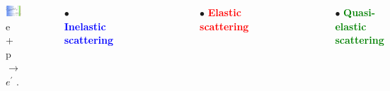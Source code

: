 \documentclass[12pt]{beamer}
\begin{document}
\fi

\begin{frame}
\begin{columns}[c] %
	\begin{figure}[]
		\centering
		\includegraphics[width=5cm]{../images/Thesis/elasticspectrum_4.png}
		\caption*{e + p $\rightarrow$ $e^{\prime}$ \cite{deltaIsobar}.}
		\label{wspect}
	\end{figure}
	
	$\bullet$ \textbf{\textcolor{blue}{Inelastic scattering}}\\
	
	\begin{figure}[]
		\includegraphics[width=4cm]{../images/ele_draw.png}
	\end{figure}

	
	$\bullet$ \textbf{\textcolor{red}{Elastic scattering}}\\
	
	\begin{figure}[]
		\includegraphics[width=4cm]{../images/ele_draw.png}
	\end{figure}
	$\bullet$ \textbf{\textcolor{green}{Quasi-elastic scattering}}\\
	
	\begin{figure}[]
		\includegraphics[width=4cm]{../images/ele_draw.png}
	\end{figure}	

	
\end{columns}
\end{frame}
\end{document}
